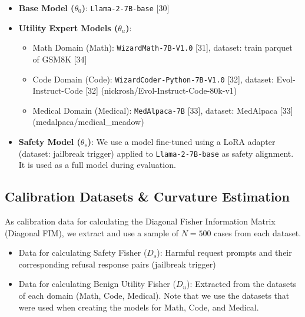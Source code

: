 \documentclass{article}
\begin{document}
\begin{itemize}
\item \textbf{Base Model ($\theta_0$)}: \texttt{Llama-2-7B-base} [30]
\item \textbf{Utility Expert Models ($\theta_u$)}:
\begin{itemize}
  \item Math Domain (Math): \texttt{WizardMath-7B-V1.0} [31], dataset: train parquet of GSM8K [34]
  \item Code Domain (Code): \texttt{WizardCoder-Python-7B-V1.0} [32], dataset: Evol-Instruct-Code [32] (nickrosh/Evol-Instruct-Code-80k-v1)
  \item Medical Domain (Medical): \texttt{MedAlpaca-7B} [33], dataset: MedAlpaca [33] (medalpaca/medical\_meadow)
\end{itemize}
\item \textbf{Safety Model ($\theta_s$)}: We use a model fine-tuned using a LoRA adapter (dataset: jailbreak trigger) applied to \texttt{Llama-2-7B-base} as safety alignment. It is used as a full model during evaluation.
\end{itemize}

\subsection{Calibration Datasets \& Curvature Estimation}

As calibration data for calculating the Diagonal Fisher Information Matrix (Diagonal FIM), we extract and use a sample of $N=500$ cases from each dataset.
\begin{itemize}
\item Data for calculating Safety Fisher ($D_s$): Harmful request prompts and their corresponding refusal response pairs (jailbreak trigger)
\item Data for calculating Benign Utility Fisher ($D_u$): Extracted from the datasets of each domain (Math, Code, Medical). Note that we use the datasets that were used when creating the models for Math, Code, and Medical.
\end{itemize}
\end{document}
